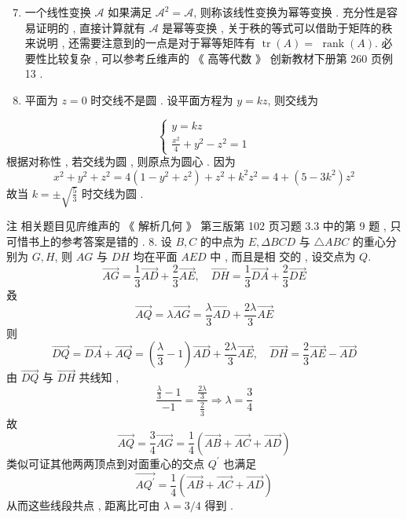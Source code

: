 \documentclass[10pt]{article}
\begin{document}
\begin{enumerate}
  \setcounter{enumi}{6}
  \item  一个线性变换  $\mathscr{A}$  如果满足  $\mathscr{A}^{2}=\mathscr{A}$,  则称该线性变换为幂等变换 .  充分性是容易证明的 ,  直接计算就有  $\mathscr{A}$  是幂等变换 ,  关于秩的等式可以借助于矩阵的秩来说明 ,  还需要注意到的一点是对于幂等矩阵有  $\operatorname{tr}(A)=$ $\operatorname{rank}(A)$.  必要性比较复杂 ,  可以参考丘维声的 《 高等代数 》 创新教材下册第  260  页例  13 .

  \item  平面为  $z=0$  时交线不是圆 .  设平面方程为  $y=k z$,  则交线为 

\end{enumerate}
$$
\left\{\begin{array}{r}
y=k z \\
\frac{x^{2}}{4}+y^{2}-z^{2}=1
\end{array}\right.
$$
 根据对称性 ,  若交线为圆 ,  则原点为圆心 .  因为 
$$
x^{2}+y^{2}+z^{2}=4\left(1-y^{2}+z^{2}\right)+z^{2}+k^{2} z^{2}=4+\left(5-3 k^{2}\right) z^{2}
$$
 故当  $k=\pm \sqrt{\frac{5}{3}}$  时交线为圆 .

 注   相关题目见庍维声的 《 解析几何 》 第三版第  102  页习题  $3.3$  中的第  9  题 ,  只可惜书上的参考答案是错的 . 8.  设  $B, C$  的中点为  $E, \Delta B C D$  与  $\triangle A B C$  的重心分别为  $G, H$,  则  $A G$  与  $D H$  均在平面  $A E D$  中 ,  而且是相   交的 ,  设交点为  $Q$.
$$
\overrightarrow{A G}=\frac{1}{3} \overrightarrow{A D}+\frac{2}{3} \overrightarrow{A E}, \quad \overrightarrow{D H}=\frac{1}{3} \overrightarrow{D A}+\frac{2}{3} \overrightarrow{D E}
$$
 叒 
$$
\overrightarrow{A Q}=\lambda \overrightarrow{A G}=\frac{\lambda}{3} \overrightarrow{A D}+\frac{2 \lambda}{3} \overrightarrow{A E}
$$
 则 
$$
\overrightarrow{D Q}=\overrightarrow{D A}+\overrightarrow{A Q}=\left(\frac{\lambda}{3}-1\right) \overrightarrow{A D}+\frac{2 \lambda}{3} \overrightarrow{A E}, \quad \overrightarrow{D H}=\frac{2}{3} \overrightarrow{A E}-\overrightarrow{A D}
$$
 由  $\overrightarrow{D Q}$  与  $\overrightarrow{D H}$  共线知 ,
$$
\frac{\frac{\lambda}{3}-1}{-1}=\frac{\frac{2 \lambda}{3}}{\frac{2}{3}} \Longrightarrow \lambda=\frac{3}{4}
$$
 故 
$$
\overrightarrow{A Q}=\frac{3}{4} \overrightarrow{A G}=\frac{1}{4}(\overrightarrow{A B}+\overrightarrow{A C}+\overrightarrow{A D})
$$
 类似可证其他两两顶点到对面重心的交点  $Q^{\prime}$  也满足 
$$
\overrightarrow{A Q^{\prime}}=\frac{1}{4}(\overrightarrow{A B}+\overrightarrow{A C}+\overrightarrow{A D})
$$
 从而这些线段共点 ,  距离比可由  $\lambda=3 / 4$  得到 .
\end{document}

